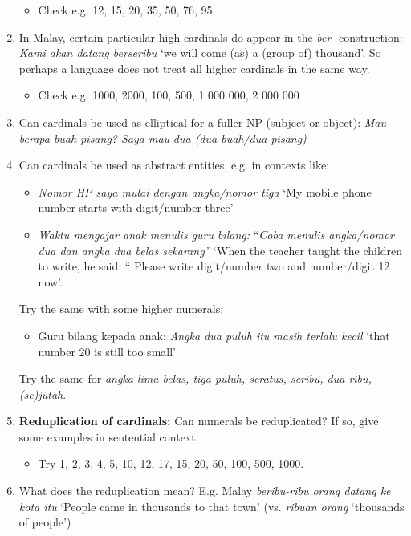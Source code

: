 \begin{enumerate}
\begin{itemize}
\item Check e.g. 12, 15, 20, 35, 50, 76, 95. 
\end{itemize}
\item In Malay, certain particular high cardinals do appear in the \textit{ber-} construction: \textit{Kami akan datang berseribu} `we will come (as) a (group of) thousand'. So perhaps a language does not treat all higher cardinals in the same way. 
\begin{itemize}
\item Check e.g. 1000, 2000, 100, 500, 1 000 000, 2 000 000
\end{itemize}
\item Can cardinals be used as elliptical for a fuller NP (subject or object): \textit{Mau berapa buah pisang? Saya mau} \textit{dua (dua buah/dua pisang)}
\item Can cardinals be used as abstract entities, e.g. in contexts like: 
\begin{itemize}
\item \textit{Nomor HP saya mulai dengan angka/nomor tiga} `My mobile phone number starts with digit/number three' 
\item \textit{Waktu mengajar anak menulis guru bilang:} ``\textit{Coba menulis angka/nomor dua dan angka dua belas sekarang''}  `When the teacher taught the children to write, he said: `` Please write digit/number two and number/digit 12 now'.
\end{itemize}
Try the same with some higher numerals: 
\begin{itemize}
\item Guru bilang kepada anak: \textit{Angka dua puluh itu masih terlalu kecil } `that number 20 is still too small' 
\end{itemize}
Try the same for \textit{angka lima belas, tiga puluh, seratus, seribu, dua ribu, (se)jutah}.
\item  \textbf{Reduplication of cardinals:} Can numerals be reduplicated? If so, give some examples in sentential context. 
\begin{itemize}
\item Try 1, 2, 3, 4, 5, 10, 12, 17, 15, 20, 50, 100, 500, 1000.
\end{itemize}
\item What does the reduplication mean? E.g. Malay \textit{beribu-ribu orang datang ke kota itu} `People came in thousands to that town' (vs. \textit{ribuan orang} `thousands of people') 

\end{enumerate}
